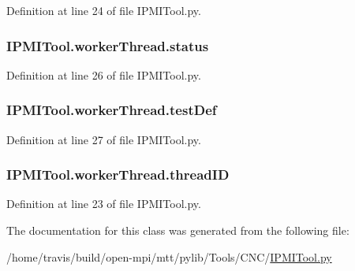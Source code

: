 Definition at line 24 of file I\-P\-M\-I\-Tool.\-py.

\hypertarget{class_i_p_m_i_tool_1_1worker_thread_a611bfcde0fa8d328904fde134bde0d87}{
\subsubsection[{status}]{\setlength{\rightskip}{0pt plus 5cm}I\-P\-M\-I\-Tool.\-worker\-Thread.\-status}}\label{class_i_p_m_i_tool_1_1worker_thread_a611bfcde0fa8d328904fde134bde0d87}


Definition at line 26 of file I\-P\-M\-I\-Tool.\-py.

\hypertarget{class_i_p_m_i_tool_1_1worker_thread_a83638bfbceb196edbfd06990e230cd8e}{
\subsubsection[{test\-Def}]{\setlength{\rightskip}{0pt plus 5cm}I\-P\-M\-I\-Tool.\-worker\-Thread.\-test\-Def}}\label{class_i_p_m_i_tool_1_1worker_thread_a83638bfbceb196edbfd06990e230cd8e}


Definition at line 27 of file I\-P\-M\-I\-Tool.\-py.

\hypertarget{class_i_p_m_i_tool_1_1worker_thread_ad9622aa9a06ed124fa430c7f57335335}{
\subsubsection[{thread\-I\-D}]{\setlength{\rightskip}{0pt plus 5cm}I\-P\-M\-I\-Tool.\-worker\-Thread.\-thread\-I\-D}}\label{class_i_p_m_i_tool_1_1worker_thread_ad9622aa9a06ed124fa430c7f57335335}


Definition at line 23 of file I\-P\-M\-I\-Tool.\-py.



The documentation for this class was generated from the following file\-:\begin{DoxyCompactItemize}
\item 
/home/travis/build/open-\/mpi/mtt/pylib/\-Tools/\-C\-N\-C/\hyperlink{_i_p_m_i_tool_8py}{I\-P\-M\-I\-Tool.\-py}\end{DoxyCompactItemize}
